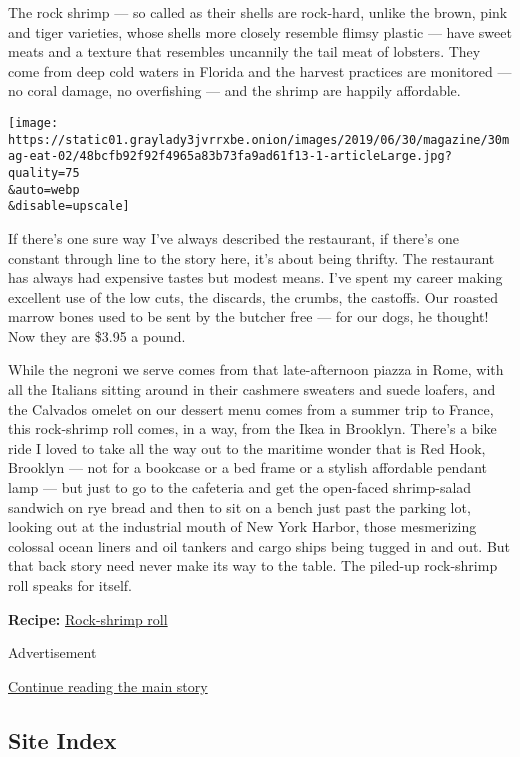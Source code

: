 The rock shrimp --- so called as their shells are rock-hard, unlike the
brown, pink and tiger varieties, whose shells more closely resemble
flimsy plastic --- have sweet meats and a texture that resembles
uncannily the tail meat of lobsters. They come from deep cold waters in
Florida and the harvest practices are monitored --- no coral damage, no
overfishing --- and the shrimp are happily affordable.

\texttt{[image: https://static01.graylady3jvrrxbe.onion/images/2019/06/30/magazine/30mag-eat-02/48bcfb92f92f4965a83b73fa9ad61f13-1-articleLarge.jpg?quality=75\\\&auto=webp\\\&disable=upscale]}

If there's one sure way I've always described the restaurant, if there's
one constant through line to the story here, it's about being thrifty.
The restaurant has always had expensive tastes but modest means. I've
spent my career making excellent use of the low cuts, the discards, the
crumbs, the castoffs. Our roasted marrow bones used to be sent by the
butcher free --- for our dogs, he thought! Now they are \$3.95 a pound.

While the negroni we serve comes from that late-afternoon piazza in
Rome, with all the Italians sitting around in their cashmere sweaters
and suede loafers, and the Calvados omelet on our dessert menu comes
from a summer trip to France, this rock-shrimp roll comes, in a way,
from the Ikea in Brooklyn. There's a bike ride I loved to take all the
way out to the maritime wonder that is Red Hook, Brooklyn --- not for a
bookcase or a bed frame or a stylish affordable pendant lamp --- but
just to go to the cafeteria and get the open-faced shrimp-salad sandwich
on rye bread and then to sit on a bench just past the parking lot,
looking out at the industrial mouth of New York Harbor, those
mesmerizing colossal ocean liners and oil tankers and cargo ships being
tugged in and out. But that back story need never make its way to the
table. The piled-up rock-shrimp roll speaks for itself.

\textbf{Recipe:}
\href{https://cooking.nytimes3xbfgragh.onion/recipes/1020322-rock-shrimp-roll}{Rock-shrimp
roll}

Advertisement

\protect\hyperlink{after-bottom}{Continue reading the main story}

\hypertarget{site-index}{%
\subsection{Site Index}\label{site-index}}

